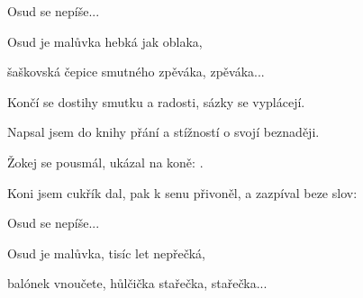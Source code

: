 \zr
Osud se nepíše...

Osud je malůvka hebká jak oblaka,

šaškovská čepice smutného zpěváka, zpěváka...
\kr

\zs
Končí se dostihy smutku a radosti,
sázky se vyplácejí.

Napsal jsem do knihy přání a stížností
o svojí beznaději.

Žokej se pousmál, ukázal na koně:
.

Koni jsem cukřík dal, pak k senu přivoněl,
a zazpíval beze slov:
\ks

\zr
Osud se nepíše...

Osud je malůvka, tisíc let nepřečká,

balónek vnoučete, hůlčička stařečka, stařečka...
\kr

\kp
